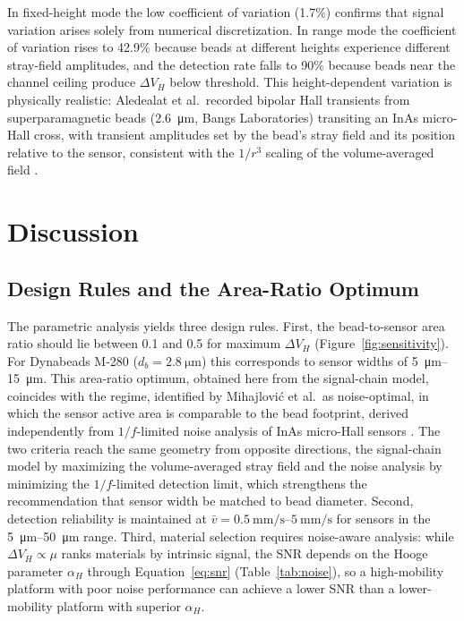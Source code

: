 \documentclass[biosensors,article,submit,pdftex,moreauthors]{Definitions/mdpi}
\begin{document}
In fixed-height mode the low coefficient of variation (1.7\%) confirms that signal
variation arises solely from numerical discretization. In range mode the coefficient
of variation rises to 42.9\% because beads at different heights experience different
stray-field amplitudes, and the detection rate falls to 90\% because beads near the
channel ceiling produce $\Delta V_H$ below threshold. This height-dependent variation
is physically realistic: Aledealat et al.\ recorded bipolar Hall transients from
superparamagnetic beads (\SI{2.6}{\micro\meter}, Bangs Laboratories) transiting an
InAs micro-Hall cross, with transient amplitudes set by the bead's stray field and
its position relative to the sensor, consistent with the $1/r^3$ scaling of the
volume-averaged field \cite{aledealat2009}.

\section{Discussion}
\label{sec:discussion}

\subsection{Design Rules and the Area-Ratio Optimum}

The parametric analysis yields three design rules. First, the bead-to-sensor area
ratio should lie between 0.1 and 0.5 for maximum $\Delta V_H$
(Figure~\ref{fig:sensitivity}). For Dynabeads M-280 ($d_b = \SI{2.8}{\micro\meter}$)
this corresponds to sensor widths of \SIrange{5}{15}{\micro\meter}. This area-ratio
optimum, obtained here from the signal-chain model, coincides with the regime,
identified by Mihajlovi\'{c} et al.\ as noise-optimal, in which the sensor active
area is comparable to the bead footprint, derived independently from
$1/f$-limited noise analysis of InAs micro-Hall sensors \cite{mihajlovic2007}. The two
criteria reach the same geometry from opposite directions, the signal-chain model by
maximizing the volume-averaged stray field and the noise analysis by minimizing the
$1/f$-limited detection limit, which strengthens the recommendation that sensor width
be matched to bead diameter. Second, detection reliability is maintained at
$\bar{v} = \SIrange{0.5}{5}{\milli\meter\per\second}$ for sensors in the
\SIrange{5}{50}{\micro\meter} range. Third, material selection requires noise-aware
analysis: while $\Delta V_H \propto \mu$ ranks materials by intrinsic signal, the SNR
depends on the Hooge parameter $\alpha_H$ through Equation~\eqref{eq:snr}
(Table~\ref{tab:noise}), so a high-mobility platform with poor noise performance can
achieve a lower SNR than a lower-mobility platform with superior $\alpha_H$.
\end{document}
